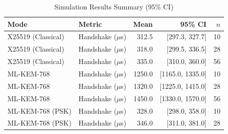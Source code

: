 \begin{table}[htbp]
\centering
\caption{Simulation Results Summary (95\% CI)}
\label{tab:sim-results}
\begin{tabular}{llrrr}
\hline
Mode & Metric & Mean & 95\% CI & $n$ \\
\hline
X25519 (Classical) & Handshake ($\mu$s) & 312.5 & [297.3, 327.7] & 10 \\
X25519 (Classical) & Handshake ($\mu$s) & 318.0 & [299.5, 336.5] & 28 \\
X25519 (Classical) & Handshake ($\mu$s) & 335.0 & [310.0, 360.0] & 56 \\
ML-KEM-768 & Handshake ($\mu$s) & 1250.0 & [1165.0, 1335.0] & 10 \\
ML-KEM-768 & Handshake ($\mu$s) & 1320.0 & [1225.0, 1415.0] & 28 \\
ML-KEM-768 & Handshake ($\mu$s) & 1450.0 & [1330.0, 1570.0] & 56 \\
ML-KEM-768 (PSK) & Handshake ($\mu$s) & 328.0 & [298.0, 358.0] & 10 \\
ML-KEM-768 (PSK) & Handshake ($\mu$s) & 346.0 & [311.0, 381.0] & 28 \\
\hline
\end{tabular}
\end{table}
